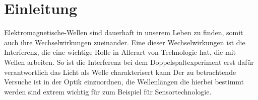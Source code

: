 \section{Einleitung}

Elektromagnetische-Wellen sind dauerhaft in unserem Leben zu finden, somit auch ihre Wechselwirkungen zueinander.
Eine dieser Wechselwirkungen ist die Interferenz, die eine wichtige Rolle in Allerart von Technologie hat, die mit Wellen arbeiten. 
So ist die Interferenz bei dem Doppelspaltexperiment erst dafür verantwortlich das Licht als Welle charakterisert kann
Der zu betrachtende Versuche ist in der Optik einzuordnen, die Wellenlängen die hierbei bestimmt werden sind extrem wichtig für zum Beispiel für Sensortechnologie. 
